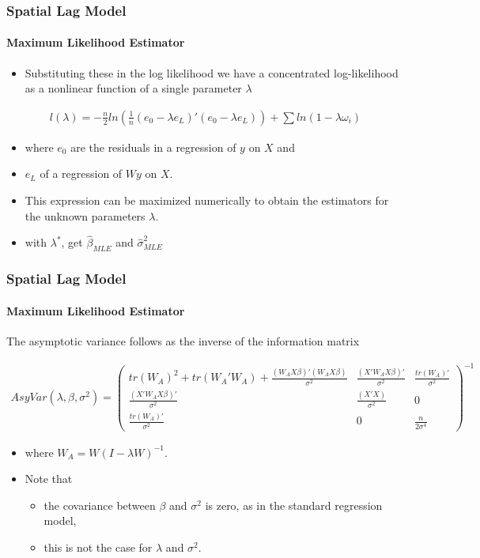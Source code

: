 \documentclass[
  shownotes,
  xcolor={svgnames},
  hyperref={colorlinks,citecolor=DarkBlue,linkcolor=DarkRed,urlcolor=DarkBlue}
  , aspectratio=169]{beamer}
\begin{document}
\begin{frame}[fragile]
\frametitle{Spatial Lag Model}
\framesubtitle{Maximum Likelihood Estimator}
\begin{itemize}
\item  Substituting these in the log likelihood we have a concentrated log-likelihood as a nonlinear function of a single parameter $\lambda$
\end{itemize}
 
 \medskip
\begin{align}
l\left(\lambda\right)=-\frac{n}{2}ln\left(\frac{1}{n}(e_{0}-\lambda e_{L})'(e_{0}-\lambda e_{L})\right)+\sum ln(1-\lambda\omega_{i})
\end{align}
\medskip
\begin{itemize}
\item where $e_{0}$ are the residuals in a regression of $y$ on $X$ and
\item $e_{L}$ of a regression of $Wy$ on $X$. 
\item This expression can be maximized numerically to obtain the estimators for the unknown parameters $\lambda$.
\item with $\lambda^*$, get $\hat \beta_{MLE}$ and  $\hat{\sigma}_{MLE}^{2}$
\end{itemize}



\end{frame}
\begin{frame}[fragile]
\frametitle{Spatial Lag Model}
\framesubtitle{Maximum Likelihood Estimator}
 The asymptotic variance follows as the inverse of the information matrix
\bigskip
\begin{scriptsize}
\begin{align}
AsyVar\left(\lambda,\beta,\sigma^{2}\right)=\left(\begin{array}{ccc}
tr(W_{A})^{2}+tr(W_{A}'W_{A})+\frac{(W_{A}X\beta)'(W_{A}X\beta)}{\sigma^{2}} & \frac{(X'W_{A}X\beta)'}{\sigma^{2}} & \frac{tr(W_{A})'}{\sigma^{2}}\\
\frac{(X'W_{A}X\beta)'}{\sigma^{2}} & \frac{(X'X)}{\sigma^{2}} & 0\\
\frac{tr(W_{A})'}{\sigma^{2}} & 0 & \frac{n}{2\sigma^{4}} 
\end{array}\right)^{-1}
\end{align}
\end{scriptsize}

\bigskip
\begin{itemize}
\item where $W_{A}=W(I-\lambda W)^{-1}$. 
\item Note that 
\begin{itemize}
  \item the covariance between $\beta$ and $\sigma^{2}$ is zero, as in the standard regression model, 
  \item this is not the case for $\lambda$ and $\sigma^{2}.$ 
\end{itemize}

\end{itemize}


\end{frame}
\end{document}

